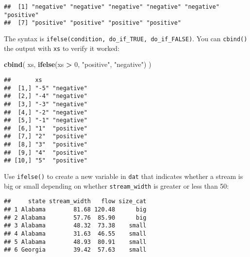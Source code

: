 \documentclass[]{book}
\newenvironment{Shaded}{\begin{snugshade}}{\end{snugshade}}
\newcommand{\DecValTok}[1]{\textcolor[rgb]{0.00,0.00,0.81}{#1}}
\newcommand{\KeywordTok}[1]{\textcolor[rgb]{0.13,0.29,0.53}{\textbf{#1}}}
\newcommand{\NormalTok}[1]{#1}
\newcommand{\OperatorTok}[1]{\textcolor[rgb]{0.81,0.36,0.00}{\textbf{#1}}}
\newcommand{\StringTok}[1]{\textcolor[rgb]{0.31,0.60,0.02}{#1}}
\begin{document}
\begin{verbatim}
##  [1] "negative" "negative" "negative" "negative" "negative" "positive"
##  [7] "positive" "positive" "positive" "positive"
\end{verbatim}

The syntax is \texttt{ifelse(condition,\ do\_if\_TRUE,\ do\_if\_FALSE)}. You can \texttt{cbind()} the output with \texttt{xs} to verify it worked:

\begin{Shaded}
\begin{Highlighting}[]
\KeywordTok{cbind}\NormalTok{(}
\NormalTok{  xs,}
  \KeywordTok{ifelse}\NormalTok{(xs }\OperatorTok{>}\StringTok{ }\DecValTok{0}\NormalTok{, }\StringTok{"positive"}\NormalTok{, }\StringTok{"negative"}\NormalTok{)}
\NormalTok{)}
\end{Highlighting}
\end{Shaded}

\begin{verbatim}
##       xs             
##  [1,] "-5" "negative"
##  [2,] "-4" "negative"
##  [3,] "-3" "negative"
##  [4,] "-2" "negative"
##  [5,] "-1" "negative"
##  [6,] "1"  "positive"
##  [7,] "2"  "positive"
##  [8,] "3"  "positive"
##  [9,] "4"  "positive"
## [10,] "5"  "positive"
\end{verbatim}

Use \texttt{ifelse()} to create a new variable in \texttt{dat} that indicates whether a stream is big or small depending on whether \texttt{stream\_width} is greater or less than 50:

\begin{Shaded}
\end{Shaded}

\begin{verbatim}
##     state stream_width   flow size_cat
## 1 Alabama        81.68 120.48      big
## 2 Alabama        57.76  85.90      big
## 3 Alabama        48.32  73.38    small
## 4 Alabama        31.63  46.55    small
## 5 Alabama        48.93  80.91    small
## 6 Georgia        39.42  57.63    small
\end{verbatim}
\end{document}

